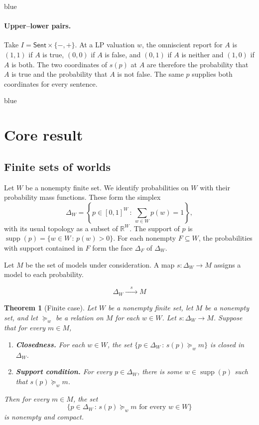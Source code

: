\documentclass[11pt]{article}
\newtheorem{theorem}{Theorem}[section]
\theoremstyle{definition}
\theoremstyle{remark}
\newcommand{\R}{\mathbb R}
\newcommand{\supp}{\operatorname{supp}}
\newcommand{\given}{\,:\,}
\newenvironment{AIwritten}{\begin{color}{blue}}{\end{color}}
\begin{document}
\begin{AIwritten}
	\paragraph{Upper--lower pairs.}
	Take $I=\mathsf{Sent}\times\{-,+\}$. At a LP
	valuation $w$, the omniscient report for $A$ is $(1,1)$ if
	$A$ is true, $(0,0)$ if $A$ is false, and $(0,1)$ if $A$
	is neither and $(1,0)$ if $A$ is both. The two coordinates of $s(p)$ at $A$ are
	therefore the probability that $A$ is true and the probability
	that $A$ is not false.  The same
	$p$ supplies both coordinates for every sentence.
\end{AIwritten}




\begin{AIwritten}
	\section{Core result}
	
	\subsection{Finite sets of worlds}
	
	Let $W$ be a nonempty finite set. We identify probabilities on $W$
	with their probability mass functions. These form the simplex
	\[
	\Delta_W
	=
	\left\{p\in[0,1]^W \given \sum_{w\in W}p(w)=1\right\},
	\]
	with its usual topology as a subset of $\R^W$. The support of $p$ is
	$\supp(p)=\{w\in W\given p(w)>0\}$. For each nonempty $F\subseteq W$,
	the probabilities with support contained in $F$ form the face
	$\Delta_F$ of $\Delta_W$.
	
	Let $M$ be the set of models under consideration. A map
	$s\colon\Delta_W\to M$ assigns a model to each probability.
	
	\[
	\Delta_W \xrightarrow{\quad s\quad} M
	\]
	
	\begin{theorem}[Finite case]
		\label{thm:finite-dominance}
		Let $W$ be a nonempty finite set, let $M$ be a nonempty set,
		and let $\succeq_w$ be a relation on $M$ for each $w\in W$.
		Let $s\colon\Delta_W\to M$. Suppose that for every $m\in M$,
		\begin{enumerate}
			\item \textbf{Closedness.}
			For each $w\in W$, the set
			$\{p\in\Delta_W\given s(p)\succeq_w m\}$ is closed in
			$\Delta_W$.
			
			\item \textbf{Support condition.}
			For every $p\in\Delta_W$, there is some $w\in\supp(p)$
			such that $s(p)\succeq_w m$.
		\end{enumerate}
		Then for every $m\in M$, the set
		\[
		\{p\in\Delta_W\given
		s(p)\succeq_w m \text{ for every }w\in W\}
		\]
		is nonempty and compact.
	\end{theorem}
	

\end{AIwritten}
\end{document}
